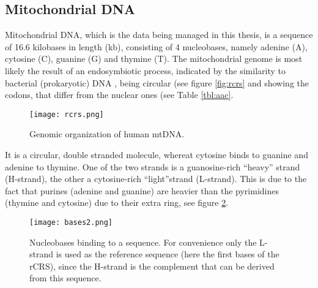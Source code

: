 \subsection{Mitochondrial DNA}
Mitochondrial DNA, which is the data being managed in this thesis, is a sequence of 16.6 kilobases in length (kb), consisting of 4 nucleobases, namely adenine (A), cytosine (C), guanine (G) and thymine (T). The mitochondrial genome is most likely the result of an endosymbiotic process, indicated by the similarity to bacterial (prokaryotic) DNA \cite{Pittis2016}, being circular (see figure \ref{fig:rcrs} and showing the codons, that differ from the nuclear ones (see Table \ref{tbl:aac}. 
\begin{figure}[ht]
\begin{center}
\texttt{[image: rcrs.png]}
\caption[Genomic organization of human mtDNA]{Genomic organization of human mtDNA. }
\label{fig:figureBases}
\end{center}
\end{figure}
It is a circular, double stranded molecule, whereat cytosine binds to guanine and adenine to thymine. One of the two strands is a guanosine-rich "`heavy"' strand (H-strand), the other a cytosine-rich "`light"'strand (L-strand). This is due to the fact that purines (adenine and guanine) are heavier than the pyrimidines (thymine and cytosine) due to their extra ring, see figure \ref{fig:figureBases}.
\begin{figure}[ht]
\begin{center}
\texttt{[image: bases2.png]}
\caption[Nucleobases binding to a sequence]{Nucleobases binding to a sequence. For convenience only the L-strand is used as the reference sequence (here the first bases of the rCRS), since the H-strand is the complement that can be derived from this sequence.}
\label{fig:figureBases}
\end{center}
\end{figure}

